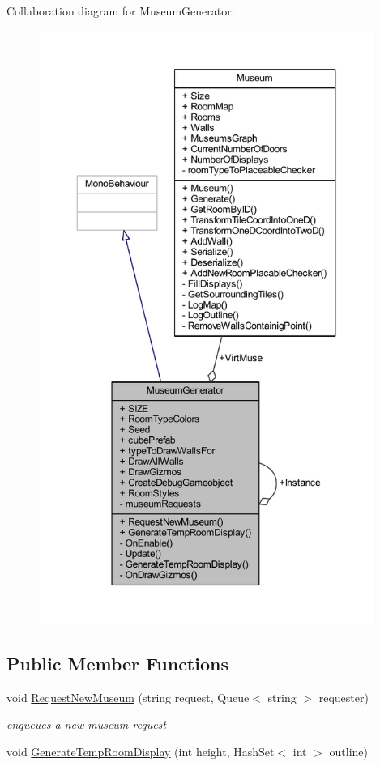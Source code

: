 Collaboration diagram for Museum\+Generator\+:
\nopagebreak
\begin{figure}[H]
\begin{center}
\leavevmode
\includegraphics[height=550pt]{class_museum_generator__coll__graph}
\end{center}
\end{figure}
\subsection*{Public Member Functions}
\begin{DoxyCompactItemize}
\item 
void \mbox{\hyperlink{class_museum_generator_a5ead852effaa81309fe98b4d61fe9759}{Request\+New\+Museum}} (string request, Queue$<$ string $>$ requester)
\begin{DoxyCompactList}\small\item\em enqueues a new museum request \end{DoxyCompactList}\item 
void \mbox{\hyperlink{class_museum_generator_a65ac409691646fa2f92ee9b84294ac57}{Generate\+Temp\+Room\+Display}} (int height, Hash\+Set$<$ int $>$ outline)
\end{DoxyCompactItemize}
